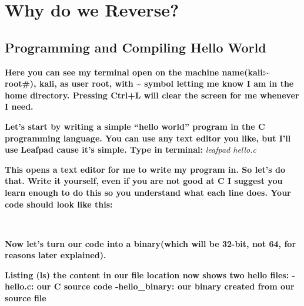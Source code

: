 \documentclass[letterpaper]{article}
\title{}
\author{}
\date{}
\newcommand{\sitfig}[3]{
\begin{figure}[H]
\centering
\makebox[\textwidth][c]{
#2
}
\label{#1}
\end{figure}
}
\newcommand{\sitgfx}[4][scale=1.0]{
\sitfig{#3}{\texttt{[image: \#2]}}{#4}
}
\begin{document}

\newpage
\pagecolor{white}

\tableofcontents

\section{Why do we Reverse?}


\subsection{Programming and Compiling Hello World}

{\centering
\sitgfx[width=6.5in,height=1.778in]{FINALWORKINGDOCFORMERLYPRECURSOR-img002.png}{fig:unk}{TODO CAPTION}
 \par}
\textbf{Here you can see my terminal open on the machine name(kali:\~{} root\#), kali, as user root, with \~{} symbol
letting me know I am in the home directory. Pressing Ctrl+L will clear the screen for me whenever I need.\newline
}

\textbf{Let's start by writing a simple ``hello world'' program in the C programming language. You can use any text
editor you like, but I'll use }\textbf{\textcolor[rgb]{0.21960784,0.4627451,0.11372549}{Leafpad }}\textbf{cause it's
simple.\newline
Type in terminal:}\textit{ leafpad hello.c\newline
\ \ }  
\sitgfx[width=4.8693in,height=3.1602in]{FINALWORKINGDOCFORMERLYPRECURSOR-img003.png}{fig:unk}{TODO CAPTION}
 \textbf{ }

\textbf{This opens a text editor for me to write my program in. So let's do that. Write it yourself, even if you are not
good at C I suggest you learn enough to do this so you understand what each line does. Your code should look like
this:}

\textbf{\newline
\ \ }  
\sitgfx[width=4.3854in,height=1.302in]{FINALWORKINGDOCFORMERLYPRECURSOR-img004.png}{fig:unk}{TODO CAPTION}
 

\textbf{Now let's turn our code into a binary(which will be 32-bit, not 64, for reasons later explained).}

  
\sitgfx[width=6.5in,height=0.5555in]{FINALWORKINGDOCFORMERLYPRECURSOR-img005.png}{fig:unk}{TODO CAPTION}
 \textbf{\newline
Listing (ls) the content in our file location now shows two hello files: \newline
{}-hello.c: our C source code\newline
{}-hello\_binary: our binary created from our source file\newline
\ \ }  
\sitgfx[width=4.7602in,height=0.6146in]{FINALWORKINGDOCFORMERLYPRECURSOR-img006.png}{fig:unk}{TODO CAPTION}
 
\end{document}
